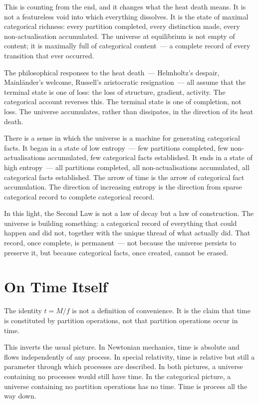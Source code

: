This is counting from the end, and it changes what the heat death means.
It is not a featureless void into which everything dissolves. It is the state of
maximal categorical richness: every partition completed, every distinction made,
every non-actualisation accumulated. The universe at equilibrium is not empty
of content; it is maximally full of categorical content~--- a complete record
of every transition that ever occurred.

The philosophical responses to the heat death~--- Helmholtz's despair, Mainländer's
welcome, Russell's aristocratic resignation~--- all assume that the terminal state
is one of loss: the loss of structure, gradient, activity. The categorical account
reverses this. The terminal state is one of completion, not loss. The universe
accumulates, rather than dissipates, in the direction of its heat death.

There is a sense in which the universe is a machine for generating categorical facts.
It began in a state of low entropy~--- few partitions completed, few non-actualisations
accumulated, few categorical facts established. It ends in a state of high entropy~---
all partitions completed, all non-actualisations accumulated, all categorical facts
established. The arrow of time is the arrow of categorical fact accumulation.
The direction of increasing entropy is the direction from sparse categorical record
to complete categorical record.

In this light, the Second Law is not a law of decay but a law of construction.
The universe is building something: a categorical record of everything that could
happen and did not, together with the unique thread of what actually did.
That record, once complete, is permanent~--- not because the universe persists
to preserve it, but because categorical facts, once created, cannot be erased.


\section*{On Time Itself}

The identity $t = M/f$ is not a definition of convenience. It is the claim that
time is constituted by partition operations, not that partition operations
occur in time.

This inverts the usual picture. In Newtonian mechanics, time is absolute and flows
independently of any process. In special relativity, time is relative but still
a parameter through which processes are described. In both pictures, a universe
containing no processes would still have time. In the categorical picture, a universe
containing no partition operations has no time. Time is process all the way down.


